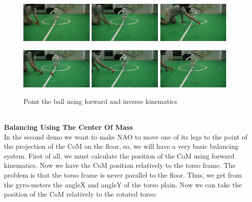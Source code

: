 \begin{figure}[!h]
\centerline{
\includegraphics[width=0.32\textwidth]{Figures/Demo1/1.png}
\includegraphics[width=0.32\textwidth]{Figures/Demo1/2.png}
\includegraphics[width=0.32\textwidth]{Figures/Demo1/3.png}
}
\vspace*{0.06cm}
\centerline{
\includegraphics[width=0.32\textwidth]{Figures/Demo1/4.png}
\includegraphics[width=0.32\textwidth]{Figures/Demo1/5.png}
\includegraphics[width=0.32\textwidth]{Figures/Demo1/6.png}
}
\vspace{-0.1cm}
\caption{Point the ball using forward and inverse kinematics}
\label{demo1}
\vspace*{0.5cm}
\end{figure}\\
\textbf{Balancing Using The Center Of Mass}\\
In the second demo we want to make NAO to move one of its legs to the point of the projection of the CoM on the floor, so, we will have a very basic balancing system. First of all, we must calculate the position of the CoM using forward kinematics. Now we have the CoM position relatively to the torso frame. The problem is that the torso frame is never parallel to the floor. Thus, we get from the gyro-meters the angleX and angleY of the torso plain. Now we can take the position of the CoM relatively to the rotated torso:
